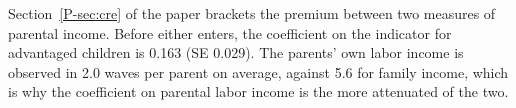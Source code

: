 Section~\ref{P-sec:cre} of the paper brackets the premium between two measures of parental income. Before either enters, the coefficient on the indicator for advantaged children is 0.163 (SE 0.029). The parents' own labor income is observed in 2.0 waves per parent on average, against 5.6 for family income, which is why the coefficient on parental labor income is the more attenuated of the two.%
